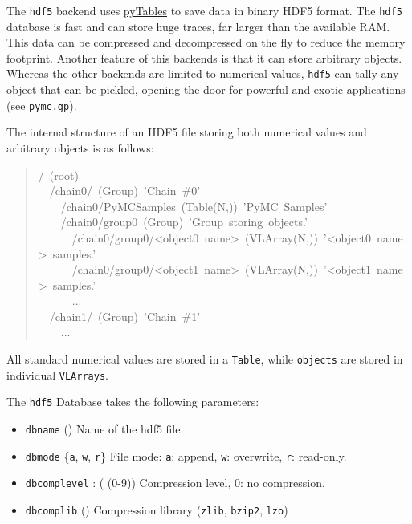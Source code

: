 The \texttt{hdf5} backend uses \href{http://www.pytables.org/moin}{pyTables} to save data in binary HDF5 format.
The \texttt{hdf5} database is fast and can store huge traces, far larger than the
available RAM. This data can be compressed and decompressed on the fly to
reduce the memory footprint.
Another feature of this backends is that it can store arbitrary objects.
Whereas the other backends are limited to numerical values, \texttt{hdf5} can
tally any object that can be pickled, opening the door for powerful and
exotic applications (see \texttt{pymc.gp}).

The internal structure of an HDF5 file storing both numerical values and
arbitrary objects is as follows:
\begin{quote}{\ttfamily \raggedright \noindent
/~(root)~\\
~~/chain0/~(Group)~'Chain~{\#}0'~\\
~~~~/chain0/PyMCSamples~(Table(N,))~'PyMC~Samples'~\\
~~~~/chain0/group0~(Group)~'Group~storing~objects.'~\\
~~~~~~/chain0/group0/<object0~name>~(VLArray(N,))~'<object0~name>~samples.'~\\
~~~~~~/chain0/group0/<object1~name>~(VLArray(N,))~'<object1~name>~samples.'~\\
~~~~~~...~\\
~~/chain1/~(Group)~'Chain~{\#}1'~\\
~~~~...
}\end{quote}

All standard numerical values are stored in a \texttt{Table}, while \texttt{objects}
are stored in individual \texttt{VLArrays}.

The \texttt{hdf5} Database takes the following parameters:
\begin{itemize}
\item {} 
\texttt{dbname} () Name of the hdf5 file.

\item {} 
\texttt{dbmode} {\{}\texttt{a}, \texttt{w}, \texttt{r}{\}} File mode: \texttt{a}: append, \texttt{w}: overwrite,
\texttt{r}: read-only.

\item {} 
\texttt{dbcomplevel} : ( (0-9)) Compression level, 0: no compression.

\item {} 
\texttt{dbcomplib} () Compression library (\texttt{zlib}, \texttt{bzip2}, \texttt{lzo})

\end{itemize}

